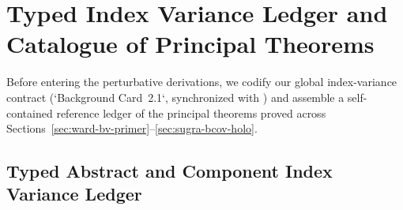 \section{Typed Index Variance Ledger and Catalogue of Principal Theorems}
\label{sec:summary-ledger}

Before entering the perturbative derivations, we codify our global index-variance contract (`Background Card~2.1`, synchronized with \zkmat) and assemble a self-contained reference ledger of the principal theorems proved across Sections~\ref{sec:ward-bv-primer}--\ref{sec:sugra-bcov-holo}.

\subsection{Typed Abstract and Component Index Variance Ledger}
\label{subsec:notation-ledger}

